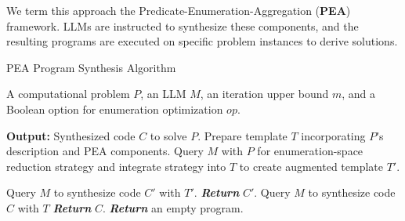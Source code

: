 We term this approach the Predicate-Enumeration-Aggregation (\textbf{PEA}) framework. LLMs are instructed to synthesize these components, and the resulting programs are executed on specific problem instances to derive solutions.

\begin{algorithm}[tb]
   \caption{PEA Program Synthesis Algorithm}
   \label{alg:pea}
\begin{algorithmic}[1]
    A computational problem $P$, an LLM $M$, an iteration upper bound $m$, and a Boolean option for enumeration optimization $op$.
   
   {\bfseries Output:} Synthesized code $C$ to solve $P$.
   \State Prepare template $T$ incorporating $P$'s description and PEA components.
   \State Query $M$ with $P$ for enumeration-space reduction strategy and integrate strategy into $T$ to create augmented template $T'$.
   
   \State Query $M$ to synthesize code $C'$ with $T'$.
    \State \textbf{\emph{Return}} $C'$.
   \EndIf
   \EndFor
   \EndIf
   \State Query $M$ to synthesize code $C$ with $T$
    \State \textbf{\emph{Return}} $C$.
    \EndIf
    \EndFor
   \State \textbf{\emph{Return}} an empty program.
\end{algorithmic}
\end{algorithm}

